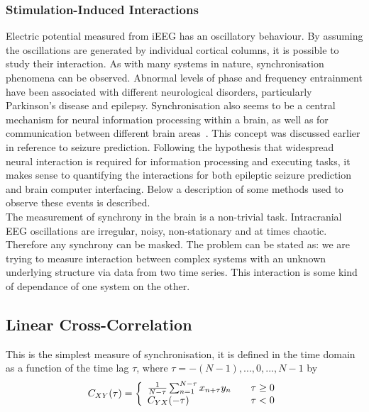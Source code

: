 \documentclass[]{article}
\begin{document}
\subsubsection{Stimulation-Induced Interactions}
Electric potential measured from iEEG has
an oscillatory behaviour. By assuming the oscillations are generated
by individual cortical columns, it is possible to study their
interaction. As with many systems in nature, synchronisation
phenomena can be observed. Abnormal levels of phase and frequency
entrainment have been associated with different neurological
disorders, particularly Parkinson's disease and epilepsy.
Synchronisation also seems to be a central mechanism for neural
information processing within a brain, as well as for communication
between different brain areas~\cite{Rosenblum2001}. This concept
was discussed earlier in reference to seizure prediction. Following
the hypothesis that widespread neural interaction is required for
information processing and executing tasks, it makes sense to
quantifying the interactions for both epileptic seizure prediction
and brain computer interfacing. Below a description of some methods
used to observe these events is described.\\

The measurement of synchrony in the brain is a non-trivial task.
Intracranial EEG oscillations are irregular, noisy, non-stationary
and at times chaotic. Therefore any synchrony can be masked. The
problem can be stated as: we are trying to measure interaction
between complex systems with an unknown underlying structure via
data from two time series. This interaction is some kind of
dependance of one system on the other.\\


\subsection{Linear Cross-Correlation}
This is the simplest measure of synchronisation, it is defined in
the time domain as a function of the time lag $\tau$, where $\tau =
-(N-1),...,0,...,N-1$ by
\begin{equation}
C_{XY}(\tau) = \left\{\begin{array}{l l}
  \frac{1}{N-\tau}\sum_{n=1}^{N-\tau}x_{n+\tau}y_n & \quad \tau \geq 0\\
  C_{YX}(-\tau) & \quad \tau <0\\ \end{array} \right.
\end{equation}
\end{document}
